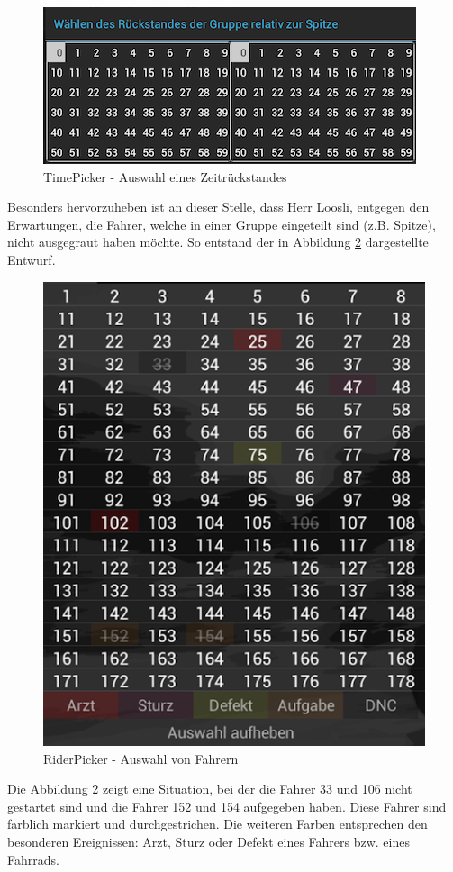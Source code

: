 \begin{figure}[h!]
\caption{TimePicker - Auswahl eines Zeitrückstandes}
\label{fig:timepicker}
\centering
\includegraphics[scale=0.8]{05bericht/images/timepicker.png}
\end{figure} 
Besonders hervorzuheben ist an dieser Stelle, dass Herr Loosli, entgegen den Erwartungen, die Fahrer, welche in einer Gruppe eingeteilt sind (z.B. Spitze), nicht ausgegraut haben möchte. So entstand der in Abbildung \ref{fig:riderpicker} dargestellte Entwurf.

\begin{figure}[h!]
\caption{RiderPicker - Auswahl von Fahrern}
\label{fig:riderpicker}
\centering
\includegraphics[scale=0.5]{05bericht/images/riderpicker.png}
\end{figure}

Die Abbildung \ref{fig:riderpicker} zeigt eine Situation, bei der die Fahrer 33 und 106 nicht gestartet sind und die Fahrer 152 und 154 aufgegeben haben. Diese Fahrer sind farblich markiert und durchgestrichen. Die weiteren Farben entsprechen den besonderen Ereignissen: Arzt, Sturz oder Defekt eines Fahrers bzw. eines Fahrrads.
